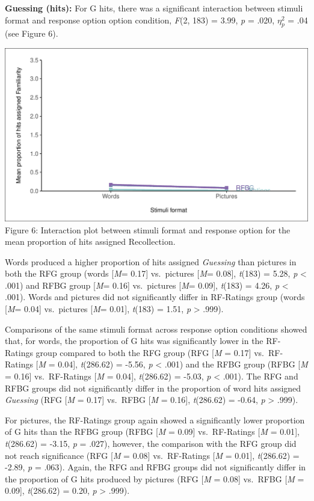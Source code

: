 \documentclass[
  11pt,
]{article}
\begin{document}
\textbf{Guessing (hits):} For G hits, there was a significant
interaction between stimuli format and response option option condition,
\emph{F}(2, 183) = 3.99, \emph{p} = .020, \(\eta^2_p\) = .04 (see Figure
6).

\includegraphics{R--Thesis_files/figure-latex/unnamed-chunk-17-1.pdf}
Figure 6: Interaction plot between stimuli format and response option
for the mean proportion of hits assigned Recollection.

Words produced a higher proportion of hits assigned \emph{Guessing} than
pictures in both the RFG group (words {[}\emph{M}= 0.17{]} vs.~pictures
{[}\emph{M}= 0.08{]}, \emph{t}(183) = 5.28, \emph{p} \textless{} .001)
and RFBG group {[}\emph{M}= 0.16{]} vs.~pictures {[}\emph{M}= 0.09{]},
\emph{t}(183) = 4.26, \emph{p} \textless{} .001). Words and pictures did
not significantly differ in RF-Ratings group (words {[}\emph{M}= 0.04{]}
vs.~pictures {[}\emph{M}= 0.01{]}, \emph{t}(183) = 1.51, \emph{p}
\textgreater{} .999).

Comparisons of the same stimuli format across response option conditions
showed that, for words, the proportion of G hits was significantly lower
in the RF-Ratings group compared to both the RFG group (RFG {[}\emph{M}
= 0.17{]} vs.~RF-Ratings {[}\emph{M} = 0.04{]}, \emph{t}(286.62) =
-5.56, \emph{p} \textless{} .001) and the RFBG group (RFBG {[}\emph{M} =
0.16{]} vs.~RF-Ratings {[}\emph{M} = 0.04{]}, \emph{t}(286.62) = -5.03,
\emph{p} \textless{} .001). The RFG and RFBG groups did not
significantly differ in the proportion of word hits assigned
\emph{Guessing} (RFG {[}\emph{M} = 0.17{]} vs.~RFBG {[}\emph{M} =
0.16{]}, \emph{t}(286.62) = -0.64, \emph{p} \textgreater{} .999).

For pictures, the RF-Ratings group again showed a significantly lower
proportion of G hits than the RFBG group (RFBG {[}\emph{M} = 0.09{]}
vs.~RF-Ratings {[}\emph{M} = 0.01{]}, \emph{t}(286.62) = -3.15, \emph{p}
= .027), however, the comparison with the RFG group did not reach
significance (RFG {[}\emph{M} = 0.08{]} vs.~RF-Ratings {[}\emph{M} =
0.01{]}, \emph{t}(286.62) = -2.89, \emph{p} = .063). Again, the RFG and
RFBG groups did not significantly differ in the proportion of G hits
produced by pictures (RFG {[}\emph{M} = 0.08{]} vs.~RFBG {[}\emph{M} =
0.09{]}, \emph{t}(286.62) = 0.20, \emph{p} \textgreater{} .999).
\end{document}
